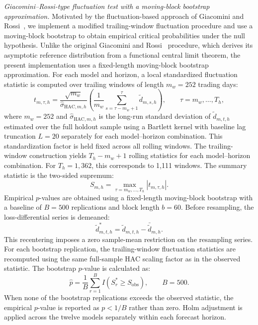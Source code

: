 \documentclass[runningheads,orivec]{llncs}
\begin{document}
\textit{Giacomini--Rossi-type fluctuation test with a moving-block bootstrap approximation.} Motivated by the fluctuation-based approach of Giacomini and Rossi~\cite{giacomini2010}, we implement a modified trailing-window fluctuation procedure and use a moving-block bootstrap to obtain empirical critical probabilities under the null hypothesis. Unlike the original Giacomini and Rossi~\cite{giacomini2010} procedure, which derives its asymptotic reference distribution from a functional central limit theorem, the present implementation uses a fixed-length moving-block bootstrap approximation. For each model and horizon, a local standardized fluctuation statistic is computed over trailing windows of length $m_w = 252$ trading days:
\begin{equation}
t_{m,\tau,h}
=
\frac{\sqrt{m_w}}{\widehat\sigma_{\mathrm{HAC},m,h}}
\left(
\frac{1}{m_w}
\sum_{s=\tau-m_w+1}^{\tau}
\widetilde d_{m,s,h}
\right),
\qquad
\tau=m_w,\ldots,T_h,
\end{equation}
where $m_w = 252$ and $\widehat\sigma_{\mathrm{HAC},m,h}$ is the long-run standard deviation of $\widetilde d_{m,t,h}$ estimated over the full holdout sample using a Bartlett kernel with baseline lag truncation $L = 20$ separately for each model--horizon combination. This standardization factor is held fixed across all rolling windows. The trailing-window construction yields $T_h-m_w+1$ rolling statistics for each model--horizon combination. For $T_h=1,362$, this corresponds to 1,111 windows. The summary statistic is the two-sided supremum:
\begin{equation}
S_{m,h}
=
\max_{\tau=m_w,\ldots,T_h}
|t_{m,\tau,h}|.
\end{equation}
Empirical $p$-values are obtained using a fixed-length moving-block bootstrap with a baseline of $B=500$ replications and block length $b=60$. Before resampling, the loss-differential series is demeaned:
\begin{equation}
\widetilde d^*_{m,t,h} = \widetilde d_{m,t,h} - \bar{\widetilde d}_{m,h}.
\end{equation}
This recentering imposes a zero sample-mean restriction on the resampling series. For each bootstrap replication, the trailing-window fluctuation statistics are recomputed using the same full-sample HAC scaling factor as in the observed statistic. The bootstrap $p$-value is calculated as:
\begin{equation}
\widehat p = \frac{1}{B} \sum_{r=1}^{B} I(S_r^* \geq S_{\mathrm{obs}}), \qquad B=500.
\end{equation}
When none of the bootstrap replications exceeds the observed statistic, the empirical $p$-value is reported as $p<1/B$ rather than zero. Holm adjustment is applied across the twelve models separately within each forecast horizon.
\end{document}

